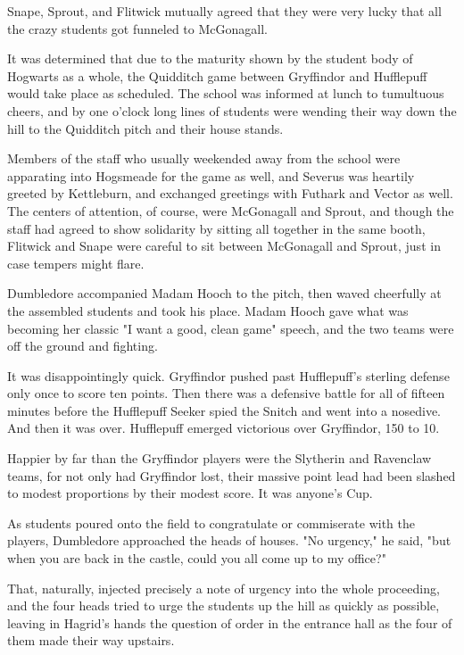 Snape, Sprout, and Flitwick mutually agreed that they were very lucky that all the crazy students got funneled to McGonagall.

It was determined that due to the maturity shown by the student body of Hogwarts as a whole, the Quidditch game between Gryffindor and Hufflepuff would take place as scheduled. The school was informed at lunch to tumultuous cheers, and by one o'clock long lines of students were wending their way down the hill to the Quidditch pitch and their house stands.

Members of the staff who usually weekended away from the school were apparating into Hogsmeade for the game as well, and Severus was heartily greeted by Kettleburn, and exchanged greetings with Futhark and Vector as well. The centers of attention, of course, were McGonagall and Sprout, and though the staff had agreed to show solidarity by sitting all together in the same booth, Flitwick and Snape were careful to sit between McGonagall and Sprout, just in case tempers might flare.

Dumbledore accompanied Madam Hooch to the pitch, then waved cheerfully at the assembled students and took his place. Madam Hooch gave what was becoming her classic "I want a good, clean game" speech, and the two teams were off the ground and fighting.

It was disappointingly quick. Gryffindor pushed past Hufflepuff's sterling defense only once to score ten points. Then there was a defensive battle for all of fifteen minutes before the Hufflepuff Seeker spied the Snitch and went into a nosedive. And then it was over. Hufflepuff emerged victorious over Gryffindor, 150 to 10.

Happier by far than the Gryffindor players were the Slytherin and Ravenclaw teams, for not only had Gryffindor lost, their massive point lead had been slashed to modest proportions by their modest score. It was anyone's Cup.

As students poured onto the field to congratulate or commiserate with the players, Dumbledore approached the heads of houses. "No urgency," he said, "but when you are back in the castle, could you all come up to my office?"

That, naturally, injected precisely a note of urgency into the whole proceeding, and the four heads tried to urge the students up the hill as quickly as possible, leaving in Hagrid's hands the question of order in the entrance hall as the four of them made their way upstairs.

